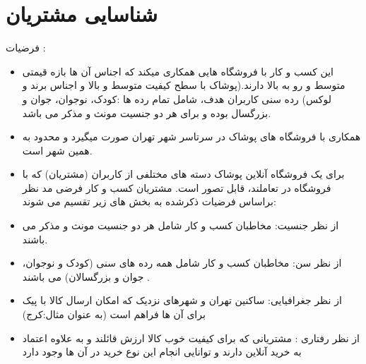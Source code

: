 \documentclass[14pt]{article}
\begin{document}
 
\section{شناسایی مشتریان}

فرضیات : 
\newline
\begin{flushright}
\begin{itemize}

\item این کسب و کار با فروشگاه هایی همکاری میکند که اجناس آن ها  بازه قیمتی متوسط و رو به بالا دارند.(پوشاک با سطح کیفیت متوسط و بالا و اجناس برند و لوکس)
رده سنی کاربران هدف، شامل تمام رده ها :‌کودک، نوجوان، جوان و بزرگسال بوده و برای هر دو جنسیت مونث و مذکر می باشد.
\item همکاری با فروشگاه های پوشاک در سرتاسر شهر تهران صورت میگیرد و محدود به همین شهر است.
\item برای یک فروشگاه آنلاین پوشاک دسته های مختلفی از کاربران (مشتریان) که با فروشگاه در تعاملند،‌ قابل تصور است. مشتریان کسب و کار فرضی مد نظر براساس فرضیات ذکرشده  به بخش های زیر تقسیم می شوند:
\item از نظر جنسیت: مخاطبان کسب و کار شامل هر دو جنسیت مونث و مذکر می باشند.
\item از نظر سن:‌ مخاطبان کسب و کار شامل همه رده های سنی (کودک و نوجوان، جوان  و بزرگسالان) می باشند . 
\item از نظر جغرافیایی: ساکنین تهران و شهرهای نزدیک که امکان ارسال کالا با پیک برای آن ها فراهم است (به عنوان مثال:‌کرج)
\item از نظر رفتاری ‌: مشتریانی که برای کیفیت خوب کالا ارزش قائلند و به علاوه اعتماد به خرید آنلاین دارند و توانایی انجام این نوع خرید در آن ها وجود دارد 
\end{itemize}

\end{flushright}
\end{document}
